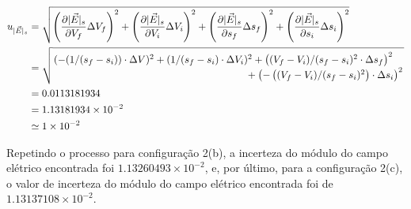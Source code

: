 \begin{align*}
u_{|\vec{E}|_s} &=\sqrt{\left(\frac{\partial |\vec{E}|_s}{\partial V_f} \Delta V_f\right)^{2}+\left(\frac{\partial |\vec{E}|_s}{\partial V_i} \Delta V_i\right)^{2}+\left(\frac{\partial |\vec{E}|_s}{\partial s_f} \Delta s_f\right)^{2}+\left(\frac{\partial |\vec{E}|_s}{\partial s_i} \Delta s_i\right)^{2}} \\
&=\sqrt{\splitfrac{(-(1 /(s_f-s_i)) \cdot \Delta V)^{2}+(1 /(s_f-s_i) \cdot \Delta V_i)^{2}+\left((V_f-V_i) /(s_f-s_i)^{2} \cdot \Delta s_f\right)^{2}}{+\left(-\left((V_f-V_i) /(s_f-s_i)^{2}\right) \cdot \Delta s_i\right)^{2}}} \\
&=0.0113181934 \\
&=1.13181934 \times 10^{-2} \\
&\simeq1 \times 10^{-2}
\end{align*}

Repetindo o processo para configuração 2(b), a incerteza do módulo do campo elétrico encontrada foi $1.13260493 \times 10^{-2}$, e, por último, para a configuração 2(c), o valor de incerteza do módulo do campo elétrico encontrada foi de $1.13137108\times 10^{-2}$.

